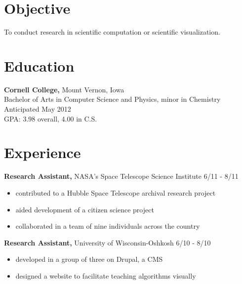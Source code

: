 \documentclass[margin]{res}
\begin{document}
 

\address{mckennapsean@gmail.com \\ 715-203-1040 }
\address{810 Commons Circle \#947 \\ Mount Vernon, IA 52314 }
 
\begin{resume} 


\section{Objective}
To conduct research in scientific computation or scientific visualization.


\section{Education}
{\bf Cornell College,} Mount Vernon, Iowa \\
Bachelor of Arts in Computer Science and Physics, minor in Chemistry \\
Anticipated May 2012 \\%
GPA: 3.98 overall, 4.00 in C.S.


\section{Experience}

{\bf Research Assistant,} NASA's Space Telescope Science Institute \hfill 6/11 - 8/11
\begin{itemize} \itemsep -2pt  %
  \item contributed to a Hubble Space Telescope archival research project
  \item aided development of a citizen science project
  \item collaborated in a team of nine individuals across the country
\end{itemize}

{\bf Research Assistant,} University of Wisconsin-Oshkosh \hfill 6/10 - 8/10
\begin{itemize} \itemsep -2pt  %
  \item developed in a group of three on Drupal, a CMS
  \item designed a website to facilitate teaching algorithms visually
\end{itemize}


\end{resume}
\end{document}
